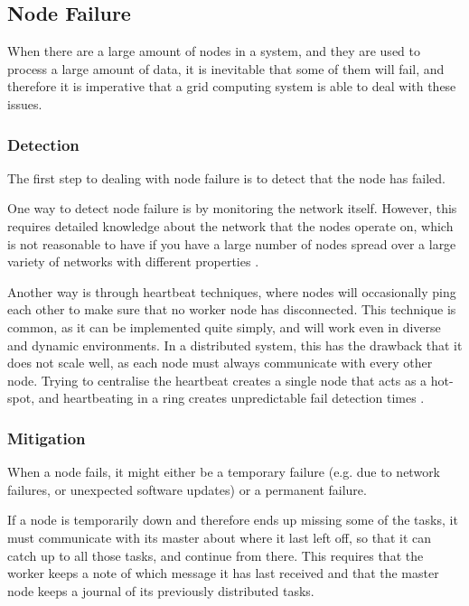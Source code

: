 \subsection{Node Failure} \label{sec:nodeFailure}

When there are a large amount of nodes in a system, and they are used to process a large amount of data, it is inevitable that some of them will fail, and therefore it is imperative that a grid computing system is able to deal with these issues.

\subsubsection{Detection}

The first step to dealing with node failure is to detect that the node has failed.

One way to detect node failure is by monitoring the network itself.
However, this requires detailed knowledge about the network that the nodes operate on, which is not reasonable to have if you have a large number of nodes spread over a large variety of networks with different properties \cite{dabrowski_2009}.

Another way is through heartbeat techniques, where nodes will occasionally ping each other to make sure that no worker node has disconnected. This technique is common, as it can be implemented quite simply, and will work even in diverse and dynamic environments. In a distributed system, this has the drawback that it does not scale well, as each node must always communicate with every other node. Trying to centralise the heartbeat creates a single node that acts as a hot-spot, and heartbeating in a ring creates unpredictable fail detection times
\cite{gupta_chandra_goldszmidt_2001}.

\subsubsection{Mitigation}

When a node fails, it might either be a temporary failure (e.g. due to network failures, or unexpected software updates) or a permanent failure. 

If a node is temporarily down and therefore ends up missing some of the tasks, it must communicate with its master about where it last left off, so that it can catch up to all those tasks, and continue from there. This requires that the worker keeps a note of which message it has last received and that the master node keeps a journal of its previously distributed tasks. 

